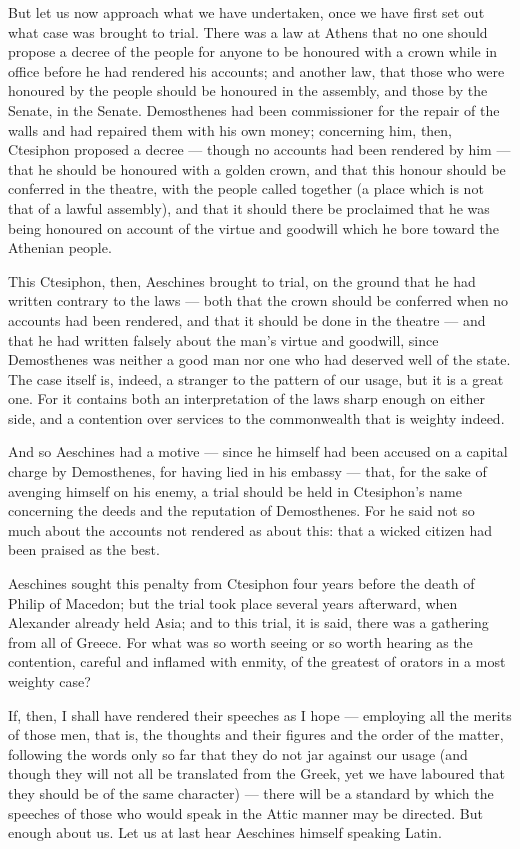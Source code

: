  But let us now approach what we have undertaken, once we have first set out what case was brought to trial. There was a law at Athens that no one should propose a decree of the people for anyone to be honoured with a crown while in office before he had rendered his accounts; and another law, that those who were honoured by the people should be honoured in the assembly, and those by the Senate, in the Senate. Demosthenes had been commissioner for the repair of the walls and had repaired them with his own money; concerning him, then, Ctesiphon proposed a decree --- though no accounts had been rendered by him --- that he should be honoured with a golden crown, and that this honour should be conferred in the theatre, with the people called together (a place which is not that of a lawful assembly), and that it should there be proclaimed that he was being honoured on account of the virtue and goodwill which he bore toward the Athenian people.

 This Ctesiphon, then, Aeschines brought to trial, on the ground that he had written contrary to the laws --- both that the crown should be conferred when no accounts had been rendered, and that it should be done in the theatre --- and that he had written falsely about the man's virtue and goodwill, since Demosthenes was neither a good man nor one who had deserved well of the state. The case itself is, indeed, a stranger to the pattern of our usage, but it is a great one. For it contains both an interpretation of the laws sharp enough on either side, and a contention over services to the commonwealth that is weighty indeed.

 And so Aeschines had a motive --- since he himself had been accused on a capital charge by Demosthenes, for having lied in his embassy --- that, for the sake of avenging himself on his enemy, a trial should be held in Ctesiphon's name concerning the deeds and the reputation of Demosthenes. For he said not so much about the accounts not rendered as about this: that a wicked citizen had been praised as the best.

 Aeschines sought this penalty from Ctesiphon four years before the death of Philip of Macedon; but the trial took place several years afterward, when Alexander already held Asia; and to this trial, it is said, there was a gathering from all of Greece. For what was so worth seeing or so worth hearing as the contention, careful and inflamed with enmity, of the greatest of orators in a most weighty case?

 If, then, I shall have rendered their speeches as I hope --- employing all the merits of those men, that is, the thoughts and their figures and the order of the matter, following the words only so far that they do not jar against our usage (and though they will not all be translated from the Greek, yet we have laboured that they should be of the same character) --- there will be a standard by which the speeches of those who would speak in the Attic manner may be directed. But enough about us. Let us at last hear Aeschines himself speaking Latin.
